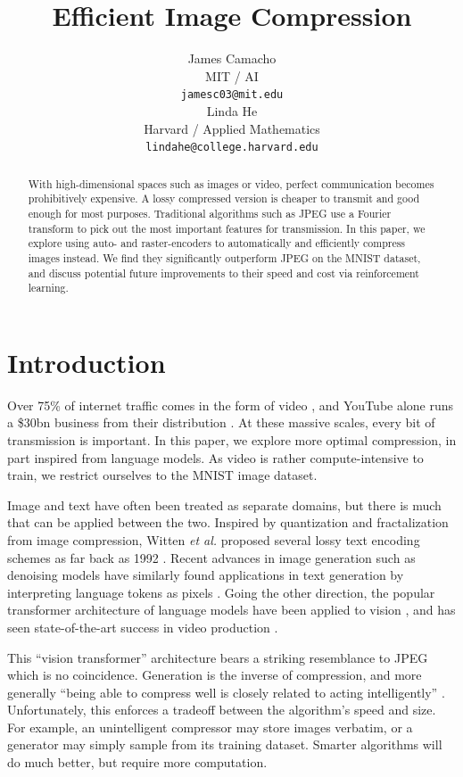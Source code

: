 \documentclass[11pt]{article}
\title{Efficient Image Compression}
\author{James Camacho \\
  MIT / AI \\
  \texttt{jamesc03@mit.edu} \\\And
  Linda He \\
  Harvard / Applied Mathematics \\
  \texttt{lindahe@college.harvard.edu} \\}
\begin{document}
\maketitle
\begin{abstract}
  With high-dimensional spaces such as images or video, perfect communication becomes prohibitively expensive. A lossy compressed version is cheaper to transmit and good enough for most purposes. Traditional algorithms such as JPEG use a Fourier transform to pick out the most important features for transmission. In this paper, we explore using auto- and raster-encoders to automatically and efficiently compress images instead. We find they significantly outperform JPEG on the MNIST dataset, and discuss potential future improvements to their speed and cost via reinforcement learning.
\end{abstract}


\section{Introduction}

Over 75\% of internet traffic comes in the form of video \citep{cisco-2018-traffic}, and YouTube alone runs a \$30bn business from their distribution \citep{alphabet-2024-earnings}. At these massive scales, every bit of transmission is important. In this paper, we explore more optimal compression, in part inspired from language models. As video is rather compute-intensive to train, we restrict ourselves to the MNIST image dataset.

Image and text have often been treated as separate domains, but there is much that can be applied between the two. Inspired by quantization and fractalization from image compression, Witten \textit{et al.} proposed several lossy text encoding schemes as far back as 1992 \citep{witten-etal-1992-lossy}. Recent advances in image generation such as denoising models \citep{ho-2020-denoising} have similarly found applications in text generation by interpreting language tokens as pixels \citep{kou-2024-cllms}. Going the other direction, the popular transformer architecture of language models have been applied to vision \citep{dosovitskiy-2021-vit}, and has seen state-of-the-art success in video production \citep{liu-2024-sora}.

This ``vision transformer'' architecture bears a striking resemblance to JPEG which is no coincidence. Generation is the inverse of compression, and more generally ``being able to compress well is closely related to acting intelligently'' \citep{hutter-2020}. Unfortunately, this enforces a tradeoff between the algorithm's speed and size. For example, an unintelligent compressor may store images verbatim, or a generator may simply sample from its training dataset. Smarter algorithms will do much better, but require more computation.
\end{document}
